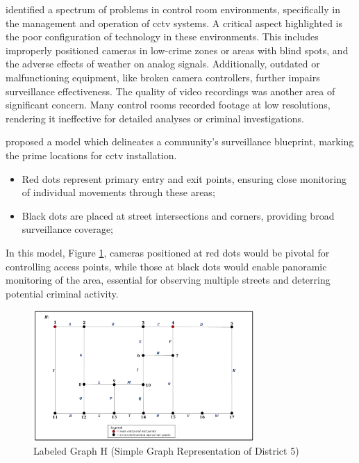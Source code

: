 \citet{rfc42} identified a spectrum of problems in control room environments, specifically in the management and operation of \ac{cctv} systems. A critical aspect highlighted is the poor configuration of technology in these environments. This includes improperly positioned cameras in low-crime zones or areas with blind spots, and the adverse effects of weather on analog signals. Additionally, outdated or malfunctioning equipment, like broken camera controllers, further impairs surveillance effectiveness. The quality of video recordings was another area of significant concern. Many control rooms recorded footage at low resolutions, rendering it ineffective for detailed analyses or criminal investigations.

\citet{rfc46} proposed a model which delineates a community's surveillance blueprint, marking the prime locations for \ac{cctv} installation. 
\begin{itemize}
    \item Red dots represent primary entry and exit points, ensuring close monitoring of individual movements through these areas;
    \item Black dots are placed at street intersections and corners, providing broad surveillance coverage;
\end{itemize}

In this model, Figure \ref{fig:cctv-positions}, cameras positioned at red dots 
would be pivotal for controlling access points, while those at black dots would enable panoramic monitoring 
of the area, essential for observing multiple streets and deterring potential criminal activity. 

\begin{figure}[h]
    \centering 
    \includegraphics[width=0.75\textwidth]{figs/cctv-positions.png} 
    \caption{Labeled Graph H (Simple Graph Representation of District 5) \cite{rfc46}}
    \label{fig:cctv-positions}
\end{figure}

